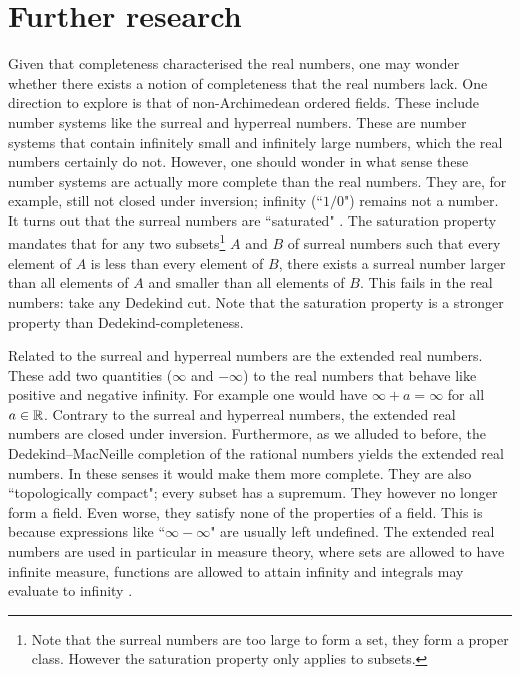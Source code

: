 \documentclass[../main.tex]{subfiles}
\begin{document}
\section{Further research}\label{sec:the_real_numbers:further_research}
Given that completeness characterised the real numbers, one may wonder wheth\-er there exists a notion of completeness that the real numbers lack. One direction to explore is that of non-Archimedean ordered fields. These include number systems like the surreal \cite{Conway1976} and hyperreal \cite{Goldblatt1998} numbers. These are number systems that contain infinitely small and infinitely large numbers, which the real numbers certainly do not. However, one should wonder in what sense these number systems are actually more complete than the real numbers. They are, for example, still not closed under inversion; infinity (``$1/0$") remains not a number. It turns out that the surreal numbers are ``saturated" \cite{Michael1963}. The saturation property mandates that for any two subsets\footnote{Note that the surreal numbers are too large to form a set, they form a proper class. However the saturation property only applies to subsets.} $A$ and $B$ of surreal numbers such that every element of $A$ is less than every element of $B$, there exists a surreal number larger than all elements of $A$ and smaller than all elements of $B$. This fails in the real numbers: take any Dedekind cut. Note that the saturation property is a stronger property than Dedekind-completeness.

Related to the surreal and hyperreal numbers are the extended real numbers. These add two quantities ($\infty$ and $-\infty$) to the real numbers that behave like positive and negative infinity. For example one would have $\infty+a=\infty$ for all $a\in\mathbb{R}$. Contrary to the surreal and hyperreal numbers, the extended real numbers are closed under inversion. Furthermore, as we alluded to before, the Dedekind–MacNeille completion of the rational numbers yields the extended real numbers. In these senses it would make them more complete. They are also ``topologically compact"; every subset has a supremum. They however no longer form a field. Even worse, they satisfy none of the properties of a field. This is because expressions like ``$\infty-\infty$" are usually left undefined. The extended real numbers are used in particular in measure theory, where sets are allowed to have infinite measure, functions are allowed to attain infinity and integrals may evaluate to infinity \cite{Veraar2022}.
\end{document}
